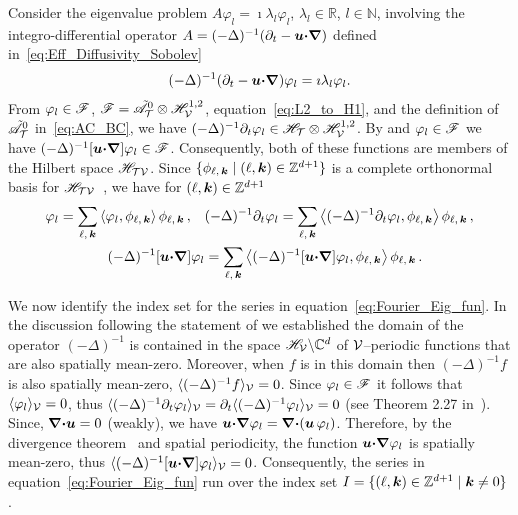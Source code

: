\documentclass[amsa]{ipart}
\begin{document}
Consider the eigenvalue problem $A\varphi_l=\imath\lambda_l\varphi_l$,
$\lambda_l\in\mathbb{R}$, $l\in\mathbb{N}$, involving the integro-differential
operator $A=(-\Delta)^{-1}(\partial_t-\boldsymbol{u} \mbox{\boldmath${\cdot}$}\mbox{\boldmath${\nabla}$})$ defined
in~\eqref{eq:Eff_Diffusivity_Sobolev} 
%
\begin{align}\label{eq:Eig_prob_A}
  (-\Delta)^{-1}(\partial_t-\vecu \bcdot\bnabla)\varphi_l=\imath\lambda_l\varphi_l.
\end{align}
%
From $\varphi_l\in\mathscr{F}$, $\mathscr{F}=\tilde{\mathscr{A}}^0_{\mathcal{T}}\otimes\mathscr{H}^{1,2}_{\mathcal{V}}$,
equation~\eqref{eq:L2_to_H1}, and the definition of
$\tilde{\mathscr{A}}^0_{\mathcal{T}}$ in~\eqref{eq:AC_BC}, we have
$(-\Delta)^{-1}\partial_t\varphi_l\in\mathscr{H}_{\mathcal{T}}\otimes\mathscr{H}^{1,2}_{\mathcal{V}}$. By 
and $\varphi_l\in\mathscr{F}$ we have
$(-\Delta)^{-1}[\boldsymbol{u}\mbox{\boldmath${\cdot}$}\mbox{\boldmath${\nabla}$}]\varphi_l\in\mathscr{F}$. Consequently, both of these  
functions are members of the Hilbert space $\mathscr{H}_{\mathcal{T}\mathcal{V}}$. Since
$\{\phi_{\ell,\,\boldsymbol{k}} \;|\; (\ell,\boldsymbol{k})\in\mathbb{Z}^{d+1}\}$ is a complete
orthonormal basis for $\mathscr{H}_{\mathcal{T}\mathcal{V}}$~\cite{Folland:99:RealAnalysis},
we have for $(\ell,\boldsymbol{k})\in\mathbb{Z}^{d+1}$
% 
\begin{align}\label{eq:Fourier_Eig_fun}
  \varphi_l=\sum_{\ell,\,\veck}\left\langle\varphi_l,\phi_{\ell,\,\veck}\right\rangle\phi_{\ell,\,\veck}\,,
  \quad
  &(-\Delta)^{-1}\partial_t\varphi_l=\sum_{\ell,\,\veck}\left\langle(-\Delta)^{-1}\partial_t\varphi_l,\phi_{\ell,\,\veck}\right\rangle\phi_{\ell,\,\veck}\,,
  \\
  (-\Delta)^{-1}[\vecu\bcdot\bnabla]\varphi_l
  &=\sum_{\ell,\,\veck}
  \left\langle(-\Delta)^{-1}[\vecu\bcdot\bnabla]\varphi_l,\phi_{\ell,\,\veck}\right\rangle\phi_{\ell,\,\veck}\,.
  \notag
\end{align}
%



We now identify the index set for the series
in equation~\eqref{eq:Fourier_Eig_fun}. In the discussion following the
statement of  we established the domain of 
the operator $(-\Delta)^{-1}$ is contained in the space $\mathscr{H}_{\mathcal{V}}\backslash\mathbb{C}^d$ of
$\mathcal{V}$--periodic functions that are also spatially mean-zero. Moreover,
when $f$ is in this domain then $(-\Delta)^{-1}f$ is also
spatially mean-zero, $\langle(-\Delta)^{-1}f\rangle_{\mathcal{V}}=0$. Since $\varphi_l\in\mathscr{F}$ it
follows that $\langle\varphi_l\rangle_{\mathcal{V}}=0$, thus
$\langle(-\Delta)^{-1}\partial_t\varphi_l\rangle_{\mathcal{V}}=\partial_t\langle(-\Delta)^{-1}\varphi_l\rangle_{\mathcal{V}}=0$ (see Theorem 2.27
in~\cite{Folland:99:RealAnalysis}). Since, 
$\mbox{\boldmath${\nabla}$}\mbox{\boldmath${\cdot}$}\boldsymbol{u}=0$ (weakly), we have
$\boldsymbol{u}\mbox{\boldmath${\cdot}$}\mbox{\boldmath${\nabla}$}\varphi_l=\mbox{\boldmath${\nabla}$}\mbox{\boldmath${\cdot}$}(\boldsymbol{u}\,\varphi_l)$. Therefore, by the
divergence theorem~\cite{McOwen:2003:PDE} and spatial periodicity, the
function $\boldsymbol{u}\mbox{\boldmath${\cdot}$}\mbox{\boldmath${\nabla}$}\varphi_l$ is spatially mean-zero, thus
$\langle(-\Delta)^{-1}[\boldsymbol{u}\mbox{\boldmath${\cdot}$}\mbox{\boldmath${\nabla}$}]\varphi_l\rangle_{\mathcal{V}}=0$. Consequently, the series
in equation~\eqref{eq:Fourier_Eig_fun} run over the index set   
$I=\{(\ell,\boldsymbol{k})\in\mathbb{Z}^{d+1} \;|\; \boldsymbol{k}\neq0\}$.
\end{document}
